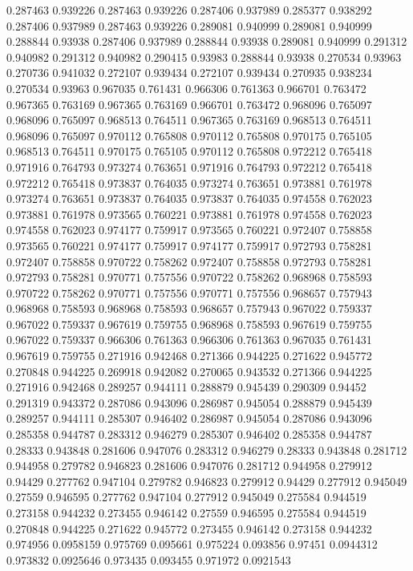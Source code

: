 0.287463 0.939226
0.287463 0.939226
0.287406 0.937989
0.285377 0.938292
0.287406 0.937989
0.287463 0.939226
0.289081 0.940999
0.289081 0.940999
0.288844 0.93938
0.287406 0.937989
0.288844 0.93938
0.289081 0.940999
0.291312 0.940982
0.291312 0.940982
0.290415 0.93983
0.288844 0.93938
0.270534 0.93963
0.270736 0.941032
0.272107 0.939434
0.272107 0.939434
0.270935 0.938234
0.270534 0.93963
0.967035 0.761431
0.966306 0.761363
0.966701 0.763472
0.967365 0.763169
0.967365 0.763169
0.966701 0.763472
0.968096 0.765097
0.968096 0.765097
0.968513 0.764511
0.967365 0.763169
0.968513 0.764511
0.968096 0.765097
0.970112 0.765808
0.970112 0.765808
0.970175 0.765105
0.968513 0.764511
0.970175 0.765105
0.970112 0.765808
0.972212 0.765418
0.971916 0.764793
0.973274 0.763651
0.971916 0.764793
0.972212 0.765418
0.972212 0.765418
0.973837 0.764035
0.973274 0.763651
0.973881 0.761978
0.973274 0.763651
0.973837 0.764035
0.973837 0.764035
0.974558 0.762023
0.973881 0.761978
0.973565 0.760221
0.973881 0.761978
0.974558 0.762023
0.974558 0.762023
0.974177 0.759917
0.973565 0.760221
0.972407 0.758858
0.973565 0.760221
0.974177 0.759917
0.974177 0.759917
0.972793 0.758281
0.972407 0.758858
0.970722 0.758262
0.972407 0.758858
0.972793 0.758281
0.972793 0.758281
0.970771 0.757556
0.970722 0.758262
0.968968 0.758593
0.970722 0.758262
0.970771 0.757556
0.970771 0.757556
0.968657 0.757943
0.968968 0.758593
0.968968 0.758593
0.968657 0.757943
0.967022 0.759337
0.967022 0.759337
0.967619 0.759755
0.968968 0.758593
0.967619 0.759755
0.967022 0.759337
0.966306 0.761363
0.966306 0.761363
0.967035 0.761431
0.967619 0.759755
0.271916 0.942468
0.271366 0.944225
0.271622 0.945772
0.270848 0.944225
0.269918 0.942082
0.270065 0.943532
0.271366 0.944225
0.271916 0.942468
0.289257 0.944111
0.288879 0.945439
0.290309 0.94452
0.291319 0.943372
0.287086 0.943096
0.286987 0.945054
0.288879 0.945439
0.289257 0.944111
0.285307 0.946402
0.286987 0.945054
0.287086 0.943096
0.285358 0.944787
0.283312 0.946279
0.285307 0.946402
0.285358 0.944787
0.28333 0.943848
0.281606 0.947076
0.283312 0.946279
0.28333 0.943848
0.281712 0.944958
0.279782 0.946823
0.281606 0.947076
0.281712 0.944958
0.279912 0.94429
0.277762 0.947104
0.279782 0.946823
0.279912 0.94429
0.277912 0.945049
0.27559 0.946595
0.277762 0.947104
0.277912 0.945049
0.275584 0.944519
0.273158 0.944232
0.273455 0.946142
0.27559 0.946595
0.275584 0.944519
0.270848 0.944225
0.271622 0.945772
0.273455 0.946142
0.273158 0.944232
0.974956 0.0958159
0.975769 0.095661
0.975224 0.093856
0.97451 0.0944312
0.973832 0.0925646
0.973435 0.093455
0.971972 0.0921543
